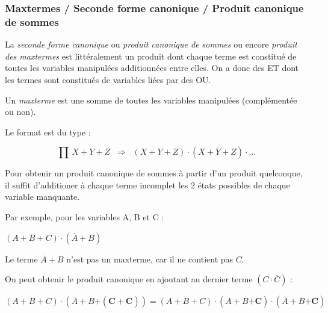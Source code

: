 \documentclass[11pt,a4paper]{article}
\begin{document}
\medskip


\subsubsection{Maxtermes / Seconde forme canonique / Produit canonique de sommes}

\medskip

La \textit{seconde forme canonique} ou \textit{produit canonique de sommes} ou encore \textit{produit des maxtermes} est littéralement un produit dont chaque terme est constitué de toutes les variables manipulées additionnées entre elles.
On a donc des ET dont les termes sont constitués de variables liées par des OU.

\medskip

Un \textit{maxterme} est une somme de toutes les variables manipulées (complémentée ou non).

\medskip

Le format est du type :

$$
\prod \, X + Y + Z   \; \; \Rightarrow \; \;  (X + Y + Z) \cdot (X + \overline{Y} + Z) \cdot 	...
$$

Pour obtenir un produit canonique de sommes à partir d'un produit quelconque, il suffit d'additioner à chaque terme incomplet les 2 états possibles de chaque variable manquante.

\medskip

Par exemple, pour les variables A, B et C :

\smallskip

$ ( A + B + C ) \cdot ( \overline{A} + B ) $

\smallskip

Le terme $ \overline{A} + B $ n'est pas un maxterme, car il ne contient pas $ C $.

On peut obtenir le produit canonique en ajoutant au dernier terme $ ( C \cdot \overline{C} ) $ :

\smallskip

$ ( A + B + C ) \cdot ( \overline{A} + B \bm{+ ( C + \overline{C} )} ) = ( A + B + C ) \cdot ( \overline{A} + B \bm{+ C} ) \cdot ( \overline{A} + B \bm{+ \overline{C}} ) $
\end{document}
